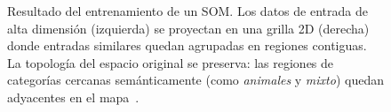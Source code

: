 \begin{figure}[H]
\caption{Resultado del entrenamiento de un SOM. Los datos de entrada de alta
dimensión (izquierda) se proyectan en una grilla 2D (derecha) donde entradas
similares quedan agrupadas en regiones contiguas. La topología del espacio
original se preserva: las regiones de categorías cercanas semánticamente
(como \textit{animales} y \textit{mixto}) quedan adyacentes en el mapa~\cite{kohonen1990som}.}
\label{fig:som_resultado}
\end{figure}
